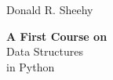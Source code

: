 \begin{titlepage} %

	\raggedleft %

	\vspace*{\baselineskip} %


	{\Large Donald R. Sheehy} %

	\vspace*{0.167\textheight} %


	\textbf{\LARGE A First Course on }\\[\baselineskip] %

	{\Huge Data Structures}\\[\baselineskip] %

	{\Large in Python} %

	\vfill %


\end{titlepage}
